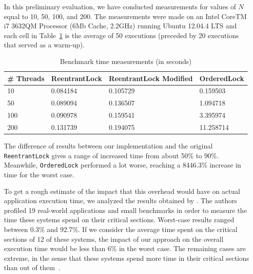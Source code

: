 In this preliminary evaluation, we have conducted measurements for values of $N$ equal to 10, 50, 100, and 200.
The measurements were made on an Intel CoreTM i7 3632QM Processor (6Mb Cache, 2.2GHz) running Ubuntu 12.04.4 LTS
and each cell in Table~\ref{tab:overhead} is the average of 50 executions (preceded by 20 executions that served as a warm-up).

\begin{table}
\begin{center}
\caption{Benchmark time measurements (in seconds)}\label{tab:overhead}
\begin{tabular}{|l|l|l|l|}
\hline
\# Threads & ReentrantLock & ReentrantLock Modified & OrderedLock \\
\hline
10 & 0.084184 & 0.105729 & 0.159503\\
50 & 0.089094 & 0.136507 & 1.094718\\
100 & 0.090978 & 0.159541 & 3.395974\\
200 & 0.131739 & 0.194075 & 11.258714\\
\hline
\end{tabular}
\end{center}
\end{table}

The difference of results between our implementation and the original {\tt ReentrantLock} gives a range of increased time from about 50\% to 90\%.
Meanwhile, {\tt OrderedLock} performed a lot worse, reaching a 8446.3\% increase in time for the worst case.

To get a rough estimate of the impact that this overhead would have on actual application execution time, we analyzed the results obtained by \citet{lozi}.
The authors profiled 19 real-world applications and small benchmarks in order to measure the time these systems spend on their critical sections.
Worst-case results ranged between 0.3\% and 92.7\%.
If we consider the average time spent on the critical sections of 12 of these systems,
the impact of our approach on the overall execution time would be less than 6\% in the worst case.
The remaining cases are extreme, in the sense that these systems spend more time in their critical sections than out of them~\citep{lozi}.

